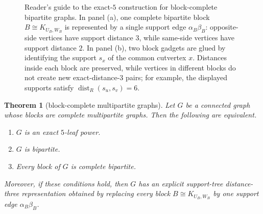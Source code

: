 \documentclass[11pt]{article}
\newtheorem{theorem}{Theorem}[section]
\theoremstyle{definition}
\newcommand{\dist}{\operatorname{dist}}
\begin{document}
\begin{figure}[H]
\caption{Reader's guide to the exact-$5$ construction for block-complete bipartite graphs.  In panel (a), one complete bipartite block $B\cong K_{U_B,W_B}$ is represented by a single support edge $\alpha_B\beta_B$: opposite-side vertices have support distance $3$, while same-side vertices have support distance $2$.  In panel (b), two block gadgets are glued by identifying the support $s_x$ of the common cutvertex $x$.  Distances inside each block are preserved, while vertices in different blocks do not create new exact-distance-$3$ pairs; for example, the displayed supports satisfy $\dist_R(s_u,s_v)=6$.}
\label{fig:block-bipartite-gadget}
\end{figure}


\begin{theorem}[block-complete multipartite graphs]\label{thm:block-complete-multipartite}
Let $G$ be a connected graph whose blocks are complete multipartite graphs.  Then the following are equivalent.
\begin{enumerate}[label=\textup{(\roman*)}]
\item $G$ is an exact $5$-leaf power.
\item $G$ is bipartite.
\item Every block of $G$ is complete bipartite.
\end{enumerate}
Moreover, if these conditions hold, then $G$ has an explicit support-tree distance-three representation obtained by replacing every block $B\cong K_{U_B,W_B}$ by one support edge $\alpha_B\beta_B$.
\end{theorem}
\end{document}
